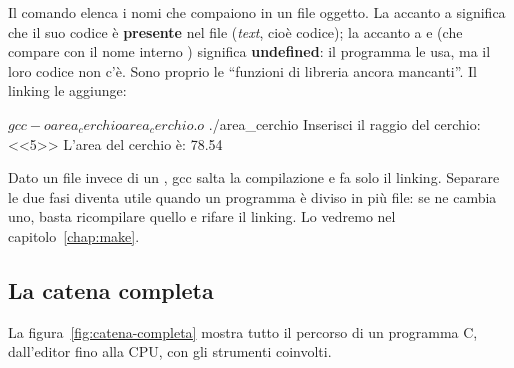 
Il comando  elenca i nomi che compaiono in un file oggetto. La
 accanto a  significa che il suo codice è
\textbf{presente} nel file (\textit{text}, cioè codice); la  accanto
a  e  (che compare con il nome interno
) significa \textbf{undefined}: il programma le usa,
ma il loro codice non c'è. Sono proprio le “funzioni di libreria ancora
mancanti”. Il linking le aggiunge:

\begin{console}
$ gcc -o area_cerchio area_cerchio.o
$ ./area_cerchio
Inserisci il raggio del cerchio: <<5>>
L'area del cerchio è: 78.54
\end{console}

Dato un file  invece di un , gcc salta la compilazione e
fa solo il linking. Separare le due fasi diventa utile quando un programma è
diviso in più file: se ne cambia uno, basta ricompilare quello e rifare il
linking. Lo vedremo nel capitolo~\ref{chap:make}.

\subsection{La catena completa}

La figura~\ref{fig:catena-completa} mostra tutto il percorso di un programma
C, dall'editor fino alla CPU, con gli strumenti coinvolti.

